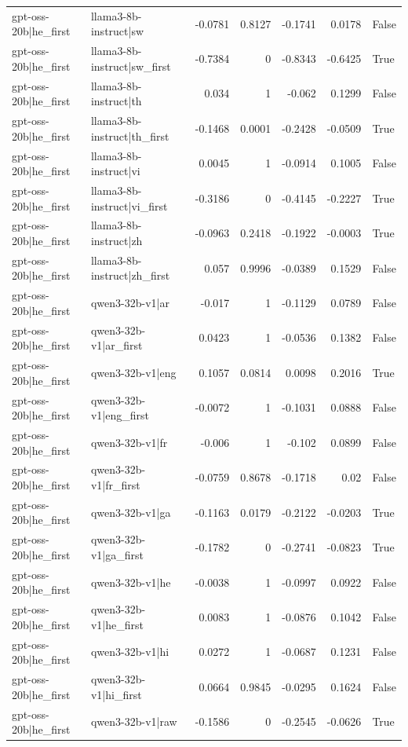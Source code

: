 \begin{table}
\begin{tabular}{l l r r r r l}
gpt-oss-20b|he_first & llama3-8b-instruct|sw & -0.0781 & 0.8127 & -0.1741 & 0.0178 & False \\
gpt-oss-20b|he_first & llama3-8b-instruct|sw_first & -0.7384 & 0 & -0.8343 & -0.6425 & True \\
gpt-oss-20b|he_first & llama3-8b-instruct|th & 0.034 & 1 & -0.062 & 0.1299 & False \\
gpt-oss-20b|he_first & llama3-8b-instruct|th_first & -0.1468 & 0.0001 & -0.2428 & -0.0509 & True \\
gpt-oss-20b|he_first & llama3-8b-instruct|vi & 0.0045 & 1 & -0.0914 & 0.1005 & False \\
gpt-oss-20b|he_first & llama3-8b-instruct|vi_first & -0.3186 & 0 & -0.4145 & -0.2227 & True \\
gpt-oss-20b|he_first & llama3-8b-instruct|zh & -0.0963 & 0.2418 & -0.1922 & -0.0003 & True \\
gpt-oss-20b|he_first & llama3-8b-instruct|zh_first & 0.057 & 0.9996 & -0.0389 & 0.1529 & False \\
gpt-oss-20b|he_first & qwen3-32b-v1|ar & -0.017 & 1 & -0.1129 & 0.0789 & False \\
gpt-oss-20b|he_first & qwen3-32b-v1|ar_first & 0.0423 & 1 & -0.0536 & 0.1382 & False \\
gpt-oss-20b|he_first & qwen3-32b-v1|eng & 0.1057 & 0.0814 & 0.0098 & 0.2016 & True \\
gpt-oss-20b|he_first & qwen3-32b-v1|eng_first & -0.0072 & 1 & -0.1031 & 0.0888 & False \\
gpt-oss-20b|he_first & qwen3-32b-v1|fr & -0.006 & 1 & -0.102 & 0.0899 & False \\
gpt-oss-20b|he_first & qwen3-32b-v1|fr_first & -0.0759 & 0.8678 & -0.1718 & 0.02 & False \\
gpt-oss-20b|he_first & qwen3-32b-v1|ga & -0.1163 & 0.0179 & -0.2122 & -0.0203 & True \\
gpt-oss-20b|he_first & qwen3-32b-v1|ga_first & -0.1782 & 0 & -0.2741 & -0.0823 & True \\
gpt-oss-20b|he_first & qwen3-32b-v1|he & -0.0038 & 1 & -0.0997 & 0.0922 & False \\
gpt-oss-20b|he_first & qwen3-32b-v1|he_first & 0.0083 & 1 & -0.0876 & 0.1042 & False \\
gpt-oss-20b|he_first & qwen3-32b-v1|hi & 0.0272 & 1 & -0.0687 & 0.1231 & False \\
gpt-oss-20b|he_first & qwen3-32b-v1|hi_first & 0.0664 & 0.9845 & -0.0295 & 0.1624 & False \\
gpt-oss-20b|he_first & qwen3-32b-v1|raw & -0.1586 & 0 & -0.2545 & -0.0626 & True \\

\end{tabular}
\end{table}
